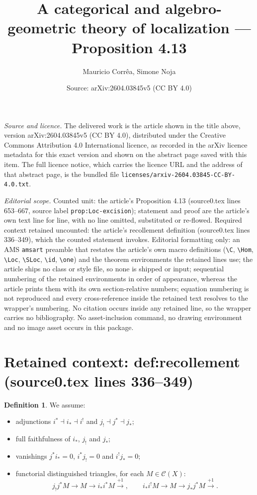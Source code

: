 \documentclass[10pt,a4paper]{amsart}
\title[A categorical and algebro-geometric theory of localization]{A categorical and algebro-geometric theory of localization — Proposition 4.13}
\author{Mauricio Corr\^ea, Simone Noja}
\date{Source: arXiv:2604.03845v5 (CC BY 4.0)}
\newcommand{\C}{\mathcal C}
\theoremstyle{plain}
\theoremstyle{definition}
\newtheorem{definition}[theorem]{Definition}
\theoremstyle{remark}
\begin{document}
\maketitle

\noindent\emph{Source and licence.} The delivered work is the article shown in the title above, version arXiv:2604.03845v5 (CC BY 4.0), distributed under the Creative Commons Attribution 4.0 International licence, as recorded in the arXiv licence metadata for this exact version and shown on the abstract page saved with this item. The full licence notice, which carries the licence URL and the address of that abstract page, is the bundled file \texttt{licenses/arxiv-2604.03845-CC-BY-4.0.txt}.\par\smallskip

\noindent\textit{Editorial scope.} Counted unit: the article's Proposition 4.13 (source0.tex lines 653--667, source label \texttt{prop:Loc-excision}); statement and proof are the article's own text line for line, with no line omitted, substituted or re-flowed. Required context retained uncounted: the article's recollement definition (source0.tex lines 336--349), which the counted statement invokes. Editorial formatting only: an AMS \texttt{amsart} preamble that restates the article's own macro definitions (\texttt{\textbackslash C}, \texttt{\textbackslash Hom}, \texttt{\textbackslash Loc}, \texttt{\textbackslash SLoc}, \texttt{\textbackslash id}, \texttt{\textbackslash one}) and the theorem environments the retained lines use; the article ships no class or style file, so none is shipped or input; sequential numbering of the retained environments in order of appearance, whereas the article prints them with its own section-relative numbers; equation numbering is not reproduced and every cross-reference inside the retained text resolves to the wrapper's numbering. No citation occurs inside any retained line, so the wrapper carries no bibliography. No asset-inclusion command, no drawing environment and no image asset occurs in this package.


\section*{Retained context: def:recollement (source0.tex lines 336--349)}

\begin{definition} \label{def:recollement}
We assume:
\begin{itemize}
\item adjunctions $i^*\dashv i_*\dashv i^!$ and $j_!\dashv j^*\dashv j_*$;
\item full faithfulness of $i_*$, $j_!$ and $j_*$;
\item vanishings $j^*i_*=0$, $i^*j_!=0$ and $i^!j_*=0$;
\item functorial distinguished triangles, for each $M\in\C(X)$:
$$
j_!j^*M \longrightarrow M \longrightarrow i_*i^*M \xrightarrow{+1},
\qquad
i_*i^!M \longrightarrow M \longrightarrow j_*j^*M \xrightarrow{+1}.
$$
\end{itemize}
\end{definition}
\end{document}
